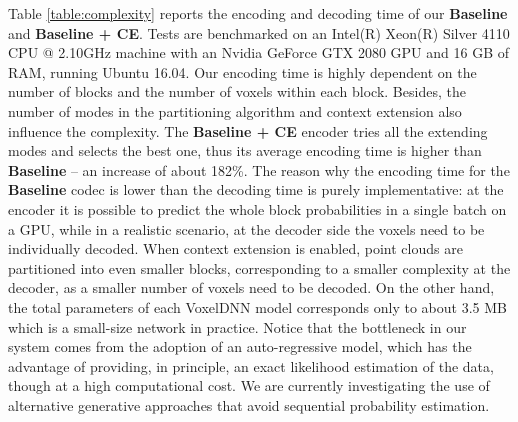 \begin{table}[t]
\caption{Average runtime (in seconds) of different encoders comparing with G-PCC.}
\centering
{}
\label{table:complexity}
\end{table}

Table \ref{table:complexity} reports the encoding and decoding time of our \textbf{Baseline} and \textbf{Baseline + CE}. 
Tests are benchmarked on an Intel(R) Xeon(R) Silver 4110 CPU @ 2.10GHz machine with an Nvidia GeForce GTX 2080 GPU and 16 GB of RAM, running Ubuntu 16.04. Our encoding time is highly dependent on the number of blocks and the number of voxels within each block. Besides, the number of modes in the partitioning algorithm and context extension also influence the complexity. 
The \textbf{Baseline + CE} encoder tries all the extending modes and selects the best one, thus its average encoding time is higher than \textbf{Baseline} -- an increase of about 182\%. The reason why the encoding time for the \textbf{Baseline} codec is lower than the decoding time is purely implementative: at the encoder it is possible to predict the whole block probabilities in a single batch on a GPU, while in a realistic scenario, at the decoder side the voxels need to be individually decoded. 
When context extension is enabled, point clouds are partitioned into even smaller blocks, corresponding to a smaller complexity at the decoder, as a smaller number of voxels need to be decoded. On the other hand, the total parameters of each VoxelDNN model corresponds only to about 3.5 MB which is a small-size network in practice. Notice that the bottleneck in our system comes from the adoption of an auto-regressive model, which has the advantage of providing, in principle, an exact likelihood estimation of the data, though at a high computational cost. We are currently investigating the use of alternative generative approaches that avoid sequential probability estimation.

